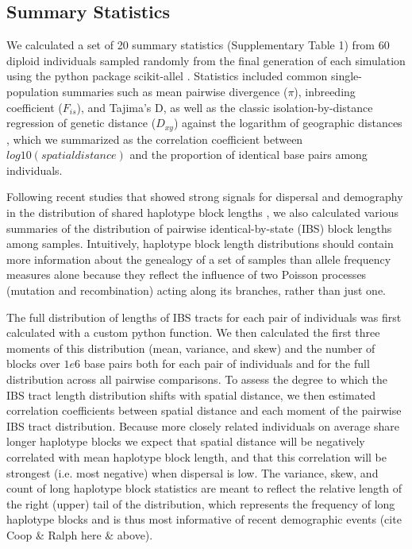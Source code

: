 \documentclass[9pt,twocolumn,twoside,lineno]{gsajnl}
\begin{document}
\subsection{Summary Statistics}
We calculated a set of 20 summary statistics (Supplementary Table 1) from 60 diploid individuals sampled randomly from the final generation of each simulation using the python package scikit-allel \citep{Miles2017}. Statistics included common single-population summaries such as mean pairwise divergence ($\pi$), inbreeding coefficient ($F_{is}$), and Tajima's D, as well as the classic isolation-by-distance regression of genetic distance ($D_{xy}$) against the logarithm of geographic distances \citep{Rousset1997}, which we summarized as the correlation coefficient between $log10(spatial distance)$ and the proportion of identical base pairs among individuals. 

Following recent studies that showed strong signals for dispersal and demography in the distribution of shared haplotype block lengths \citep{Ringbauer2017,Baharian2016}, we also calculated various summaries of the distribution of pairwise identical-by-state (IBS) block lengths among samples. Intuitively, haplotype block length distributions should contain more information about the genealogy of a set of samples than allele frequency measures alone because they reflect the influence of two Poisson processes (mutation and recombination) acting along its branches, rather than just one. 

The full distribution of lengths of IBS tracts for each pair of individuals was first calculated with a custom python function. We then calculated the first three moments of this distribution (mean, variance, and skew) and the number of blocks over $1e6$ base pairs both for each pair of individuals and for the full distribution across all pairwise comparisons. To assess the degree to which the IBS tract length distribution shifts with spatial distance, we then estimated correlation coefficients between spatial distance and each moment of the pairwise IBS tract distribution. Because more closely related individuals on average share longer haplotype blocks we expect that spatial distance will be negatively correlated with mean haplotype block length, and that this correlation will be strongest (i.e. most negative) when dispersal is low. The variance, skew, and count of long haplotype block statistics are meant to reflect the relative length of the right (upper) tail of the distribution, which represents the frequency of long haplotype blocks and is thus most informative of recent demographic events \citep{Ringbauer2017} (cite Coop \& Ralph here \& above). 
\end{document}
